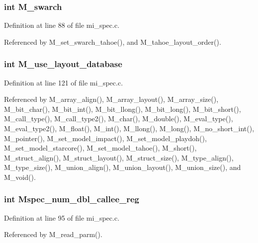 \subsubsection{\setlength{\rightskip}{0pt plus 5cm}int \bf{M\_\-swarch}}\label{m__spec_8h_383736f80767f9f15b4a1c30051ad5d3}




Definition at line 88 of file mi\_\-spec.c.

Referenced by M\_\-set\_\-swarch\_\-tahoe(), and M\_\-tahoe\_\-layout\_\-order().
\subsubsection{\setlength{\rightskip}{0pt plus 5cm}int \bf{M\_\-use\_\-layout\_\-database}}\label{m__spec_8h_f7153def0e1996515f36efbbe183ee4c}




Definition at line 121 of file mi\_\-spec.c.

Referenced by M\_\-array\_\-align(), M\_\-array\_\-layout(), M\_\-array\_\-size(), M\_\-bit\_\-char(), M\_\-bit\_\-int(), M\_\-bit\_\-llong(), M\_\-bit\_\-long(), M\_\-bit\_\-short(), M\_\-call\_\-type(), M\_\-call\_\-type2(), M\_\-char(), M\_\-double(), M\_\-eval\_\-type(), M\_\-eval\_\-type2(), M\_\-float(), M\_\-int(), M\_\-llong(), M\_\-long(), M\_\-no\_\-short\_\-int(), M\_\-pointer(), M\_\-set\_\-model\_\-impact(), M\_\-set\_\-model\_\-playdoh(), M\_\-set\_\-model\_\-starcore(), M\_\-set\_\-model\_\-tahoe(), M\_\-short(), M\_\-struct\_\-align(), M\_\-struct\_\-layout(), M\_\-struct\_\-size(), M\_\-type\_\-align(), M\_\-type\_\-size(), M\_\-union\_\-align(), M\_\-union\_\-layout(), M\_\-union\_\-size(), and M\_\-void().
\subsubsection{\setlength{\rightskip}{0pt plus 5cm}int \bf{Mspec\_\-num\_\-dbl\_\-callee\_\-reg}}\label{m__spec_8h_6a572a4b44a9cff94fc7b8dd665e2bc4}




Definition at line 95 of file mi\_\-spec.c.

Referenced by M\_\-read\_\-parm().
